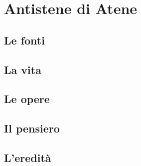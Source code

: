 \chapter{Antistene di Atene}

\section{Le fonti}

\section{La vita}

\section{Le opere}

\section{Il pensiero}

\section{L'eredità}
